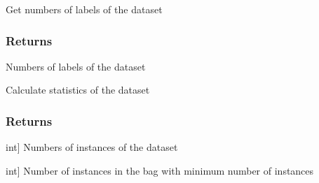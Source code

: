 \documentclass[letterpaper,10pt,english]{sphinxmanual}
\begin{document}
\begin{fulllineitems}
\begin{fulllineitems}
\end{fulllineitems}


\begin{fulllineitems}
\label{\detokenize{data/_autosummary/miml.data.miml_dataset.MIMLDataset:miml.data.miml_dataset.MIMLDataset.get_number_labels}}
\pysigstartsignatures
{}
\pysigstopsignatures
\sphinxAtStartPar
Get numbers of labels of the dataset


\subsubsection{Returns}
\label{\detokenize{data/_autosummary/miml.data.miml_dataset.MIMLDataset:id27}}\begin{description}
\sphinxAtStartPar
Numbers of labels of the dataset

\end{description}

\end{fulllineitems}


\begin{fulllineitems}
\label{\detokenize{data/_autosummary/miml.data.miml_dataset.MIMLDataset:miml.data.miml_dataset.MIMLDataset.get_statistics}}
\pysigstartsignatures
{}
\pysigstopsignatures
\sphinxAtStartPar
Calculate statistics of the dataset


\subsubsection{Returns}
\label{\detokenize{data/_autosummary/miml.data.miml_dataset.MIMLDataset:id28}}\begin{description}
\sphinxlineitem{n\_instances}{[}int{]}
\sphinxAtStartPar
Numbers of instances of the dataset

\sphinxlineitem{min\_instances}{[}int{]}
\sphinxAtStartPar
Number of instances in the bag with minimum number of instances


\end{description}
\end{fulllineitems}
\end{fulllineitems}
\end{document}
